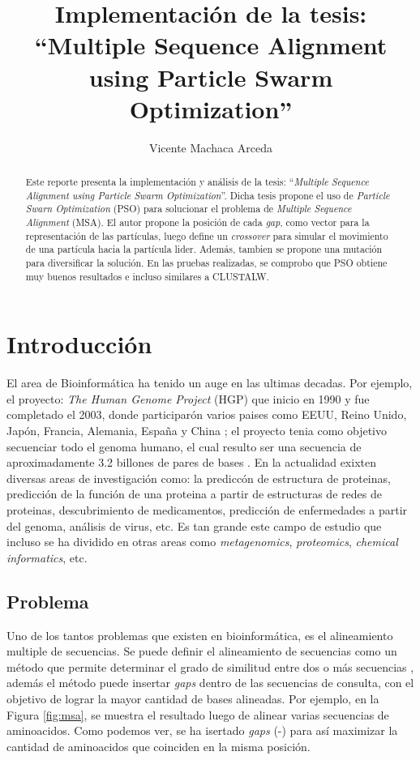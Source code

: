 \documentclass{cup-pan}
\title{Implementación de la tesis: \\``Multiple Sequence Alignment using Particle Swarm Optimization''}
\author[1]{Vicente Machaca Arceda}
\affil[1]{Universidad Nacional de San Agustín de Arequipa. Email: \url{vicente.machaca.a@gmail.com}}
\begin{document}
	
	\maketitle
	
	\begin{abstract}
		Este reporte presenta la implementación y análisis de la tesis: ``\textit{Multiple Sequence Alignment using Particle Swarm Optimization}''. Dicha tesis propone el uso de \textit{Particle Swarn Optimization} (PSO) para solucionar el problema de \textit{Multiple Sequence Alignment} (MSA). El autor propone la posición de cada \textit{gap}, como vector para la representación de las partículas, luego define un \textit{crossover} para simular el movimiento de una partícula hacia la partícula lider. Además, tambien se propone una mutación para diversificar la solución. En las pruebas realizadas, se comprobo que PSO obtiene muy buenos resultados e incluso similares a CLUSTALW.
		\\
		
	\end{abstract}
	
	
	\section{Introducción}
	El area de Bioinformática ha tenido un auge en las ultimas decadas. Por ejemplo, el proyecto: \textit{The Human Genome Project} (HGP) que inicio en 1990 y fue completado el 2003, donde participarón varios paises como EEUU, Reino Unido, Japón, Francia, Alemania, España y China  \citep{hgp2021}; el proyecto tenia como objetivo secuenciar todo el genoma humano, el cual resulto ser una secuencia de aproximadamente 3.2 billones de pares de bases \citep{archibald2018genomics}. En la actualidad exixten diversas areas de investigación como: la prediccón de estructura de proteinas, predicción de la función de una proteina a partir de estructuras de redes de proteinas, descubrimiento de medicamentos, predicción de enfermedades a partir del genoma, análisis de virus, etc. Es tan grande este campo de estudio que incluso se ha dividido en otras areas como \textit{metagenomics}, \textit{proteomics}, \textit{chemical informatics}, etc. 
	
	\subsection{Problema}
	
	Uno de los tantos problemas que existen en bioinformática, es el alineamiento multiple de secuencias. Se puede definir el alineamiento de secuencias como un método que permite determinar el grado de similitud entre dos o más secuencias \citep{xiong2006essential}, además el método puede insertar \textit{gaps} dentro de las secuencias de consulta, con el objetivo de lograr la mayor cantidad de bases alineadas. Por ejemplo, en la Figura \ref{fig:msa}, se muestra el resultado luego de alinear varias secuencias de aminoacidos. Como podemos ver, se ha isertado \textit{gaps} (-) para así maximizar la cantidad de aminoacidos que coinciden en la misma posición. \\
	
\end{document}

